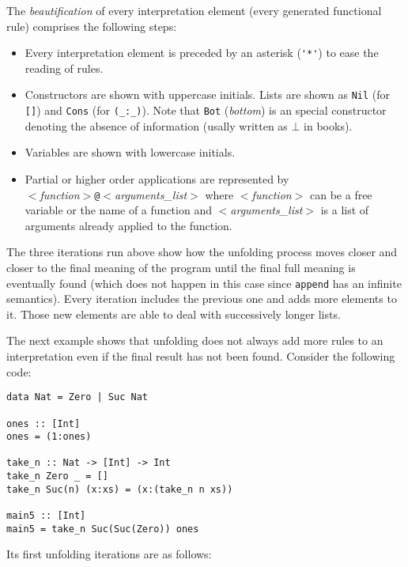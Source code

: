 \documentclass[11pt,a4paper,twoside,openright]{book}
\begin{document}
The {\em beautification} of every interpretation element (every
generated functional rule) comprises the following steps:

\begin{itemize}
\item
Every interpretation element is preceded by an asterisk (\verb.'*'.)
to ease the reading of rules.

\item
Constructors are shown with uppercase initials. Lists are shown as
{\tt Nil} (for {\tt []}) and {\tt Cons} (for {\tt (\_:\_)}). Note that
{\tt Bot} ({\em bottom}) is an special constructor denoting the absence of
information (usally written as $\bot$ in books).

\item
Variables are shown with lowercase initials.

\item
Partial or higher order applications are represented by \\ 
{\em $<$function$>$}{\tt @}{\em $<$arguments\_list$>$} where {\em
  $<$function$>$} can be a free variable or the name of a function and
{\em $<$arguments\_list$>$} is a list of arguments already applied to the
function. 
\end{itemize}  

\noindent
The three iterations run above show how the unfolding process moves
closer and closer to the final meaning of the program until the final
full meaning is eventually found (which does not happen in this case
since {\tt append} has an infinite semantics). Every iteration
includes the previous one and adds more elements to it. Those new
elements are able to deal with successively longer lists.

The next example shows that unfolding does not always add more rules
to an interpretation even if the final result has not been
found. Consider the following code:

\begin{verbatim}
data Nat = Zero | Suc Nat

ones :: [Int]
ones = (1:ones)

take_n :: Nat -> [Int] -> Int
take_n Zero _ = []
take_n Suc(n) (x:xs) = (x:(take_n n xs))

main5 :: [Int]
main5 = take_n Suc(Suc(Zero)) ones
\end{verbatim}

\noindent
Its first unfolding iterations are as follows:
\end{document}
